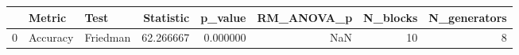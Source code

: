 \begin{tabular}{lllrrrrr}
\toprule
 & Metric & Test & Statistic & p_value & RM_ANOVA_p & N_blocks & N_generators \\
\midrule
0 & Accuracy & Friedman & 62.266667 & 0.000000 & NaN & 10 & 8 \\
\bottomrule
\end{tabular}

